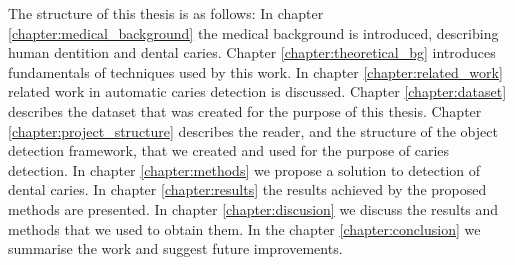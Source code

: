 The structure of this thesis is as follows: In chapter \ref{chapter:medical_background} the medical background is introduced, describing human dentition and dental caries. Chapter \ref{chapter:theoretical_bg} introduces fundamentals of techniques used by this work. In chapter \ref{chapter:related_work} related work in automatic caries detection is discussed. Chapter \ref{chapter:dataset} describes the dataset that was created for the purpose of this thesis. Chapter \ref{chapter:project_structure} describes the reader, and the structure of the object detection framework, that we created and used for the purpose of caries detection. In chapter \ref{chapter:methods} we propose a solution to detection of dental caries. In chapter \ref{chapter:results} the results achieved by the proposed methods are presented. In chapter \ref{chapter:discusion} we discuss the results and methods that we used to obtain them. In the chapter \ref{chapter:conclusion} we summarise the work and suggest future improvements.


